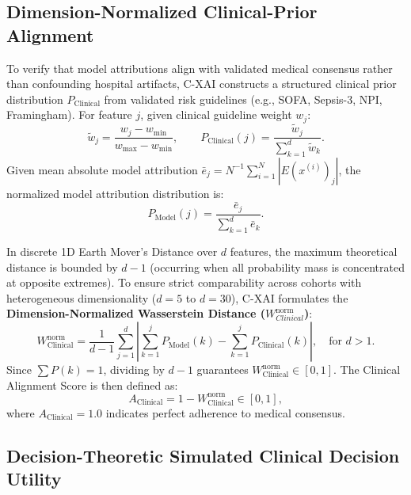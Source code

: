 \documentclass[3p,times,procedia]{elsarticle}
\theoremstyle{definition}
\begin{document}
\subsection{Dimension-Normalized Clinical-Prior Alignment}

To verify that model attributions align with validated medical consensus rather than confounding hospital artifacts, C-XAI constructs a structured clinical prior distribution $P_{\mathrm{Clinical}}$ from validated risk guidelines (e.g., SOFA, Sepsis-3, NPI, Framingham). For feature $j$, given clinical guideline weight $w_j$:
\begin{equation}
\tilde{w}_j = \frac{w_j - w_{\min}}{w_{\max} - w_{\min}}, \qquad P_{\mathrm{Clinical}}(j) = \frac{\tilde{w}_j}{\sum_{k=1}^{d}\tilde{w}_k}.
\label{eq:clinicalprior}
\end{equation}
Given mean absolute model attribution $\bar{e}_j = N^{-1}\sum_{i=1}^N |E(x^{(i)})_j|$, the normalized model attribution distribution is:
\begin{equation}
P_{\mathrm{Model}}(j) = \frac{\bar{e}_j}{\sum_{k=1}^{d}\bar{e}_k}.
\label{eq:modelprior}
\end{equation}

In discrete 1D Earth Mover's Distance over $d$ features, the maximum theoretical distance is bounded by $d-1$ (occurring when all probability mass is concentrated at opposite extremes). To ensure strict comparability across cohorts with heterogeneous dimensionality ($d=5$ to $d=30$), C-XAI formulates the \textbf{Dimension-Normalized Wasserstein Distance ($W_{Clinical}^{\mathrm{norm}}$)}:
\begin{equation}
W_{\mathrm{Clinical}}^{\mathrm{norm}} = \frac{1}{d-1}\sum_{j=1}^{d}\left|\sum_{k=1}^{j}P_{\mathrm{Model}}(k) - \sum_{k=1}^{j}P_{\mathrm{Clinical}}(k)\right|, \quad \text{for } d > 1.
\label{eq:wclinical_norm}
\end{equation}
Since $\sum P(k)=1$, dividing by $d-1$ guarantees $W_{\mathrm{Clinical}}^{\mathrm{norm}} \in [0, 1]$. The Clinical Alignment Score is then defined as:
\begin{equation}
A_{\mathrm{Clinical}} = 1 - W_{\mathrm{Clinical}}^{\mathrm{norm}} \in [0, 1],
\label{eq:clinicalalignment}
\end{equation}
where $A_{\mathrm{Clinical}} = 1.0$ indicates perfect adherence to medical consensus.

\subsection{Decision-Theoretic Simulated Clinical Decision Utility}
\end{document}
